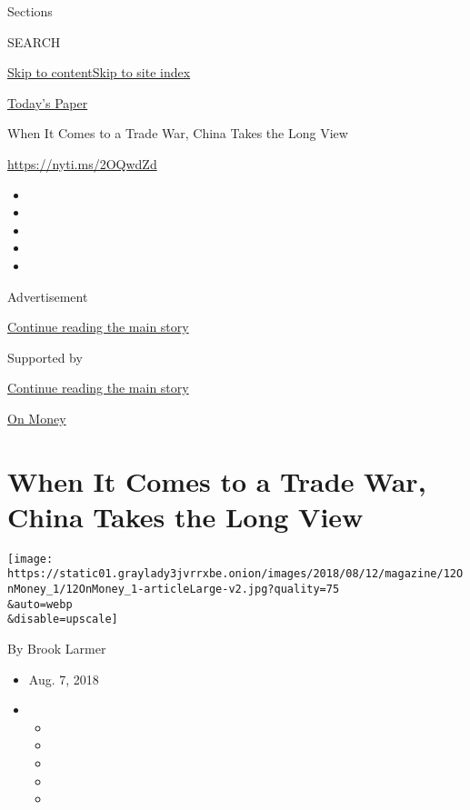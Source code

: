 Sections

SEARCH

\protect\hyperlink{site-content}{Skip to
content}\protect\hyperlink{site-index}{Skip to site index}

\href{https://myaccount.nytimes3xbfgragh.onion/auth/login?response_type=cookie\&client_id=vi}{}

\href{https://www.nytimes3xbfgragh.onion/section/todayspaper}{Today's
Paper}

When It Comes to a Trade War, China Takes the Long View

\url{https://nyti.ms/2OQwdZd}

\begin{itemize}
\item
\item
\item
\item
\item
\end{itemize}

Advertisement

\protect\hyperlink{after-top}{Continue reading the main story}

Supported by

\protect\hyperlink{after-sponsor}{Continue reading the main story}

\href{/column/on-money}{On Money}

\hypertarget{when-it-comes-to-a-trade-war-china-takes-the-long-view}{%
\section{When It Comes to a Trade War, China Takes the Long
View}\label{when-it-comes-to-a-trade-war-china-takes-the-long-view}}

\texttt{[image: https://static01.graylady3jvrrxbe.onion/images/2018/08/12/magazine/12OnMoney\_1/12OnMoney\_1-articleLarge-v2.jpg?quality=75\\\&auto=webp\\\&disable=upscale]}

By Brook Larmer

\begin{itemize}
\item
  Aug. 7, 2018
\item
  \begin{itemize}
  \item
  \item
  \item
  \item
  \item
  \end{itemize}
\end{itemize}

